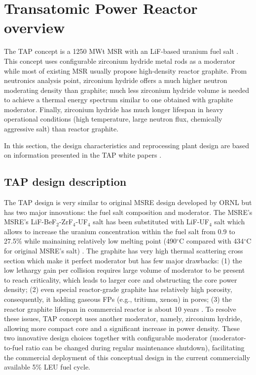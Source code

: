 \section{Transatomic Power Reactor overview}
The \gls{TAP} concept is a 1250 MWt \gls{MSR} with an LiF-based uranium fuel salt 
\cite{transatomic_power_corporation_technical_2016}. This concept uses 
configurable zirconium hydride metal rods as a moderator while most of existing 
\gls{MSR} usually propose high-density reactor graphite. From neutronics analysis 
point, zirconium hydride offers a much higher neutron moderating density than graphite;
much less zirconium hydride volume is needed to achieve a thermal energy spectrum similar to one obtained with graphite moderator. Finally, zirconium hydride has 
much longer lifespan in heavy operational conditions (high temperature, large 
neutron flux, chemically aggressive salt) than reactor graphite.

In this section, the design characteristics and reprocessing plant design 
are based on information presented in the \gls{TAP} white papers \cite{transatomic_power_corporation_technical_2016, transatomic_power_corporation_neutronics_2016}.

\subsection{TAP design description}
The \gls{TAP} design is very similar to original \gls{MSRE} design developed by \gls{ORNL} 
 \cite{haubenreich_experience_1970} but has two major innovations: the fuel salt composition 
and moderator. The \gls{MSRE}'s MSRE’s LiF-BeF$_2$-ZrF$_4$-UF$_4$ salt has been substituted with 
LiF-UF$_4$ salt which allows to increase the uranium concentration within the fuel salt from 0.9 to 
27.5\% while mainaining relatively low melting point (490$^{\circ}$C compared with 434$^{\circ}$C 
for original \gls{MSRE}'s salt) \cite{betzler_two-dimensional_2016}. The graphite has very high 
thermal scattering cross section which make it perfect moderator but has few major drawbacks: 
(1) the low lethargy gain per collision requires large volume of moderator to be present to reach criticality, which leads to larger core and obstructing the core power density; (2) even special 
reactor-grade graphite has relatively high porosity, consequently, it holding gaseous \glspl{FP} 
(e.g., tritium, xenon) in pores; (3) the reactor graphite lifespan in commercial reactor is about 
10 years \cite{robertson_conceptual_1971}. To resolve these issues, \gls{TAP} concept uses another 
moderator, namely, zirconium hydride, allowing more compact core and a significant increase in 
power density. These two innovative design choices together with configurable moderator 
(moderator-to-fuel ratio can be changed during regular maintenance shutdown), facilitating 
the commercial deployment of this conceptual design in the current commercially available 
5\% \gls{LEU} fuel cycle. 

